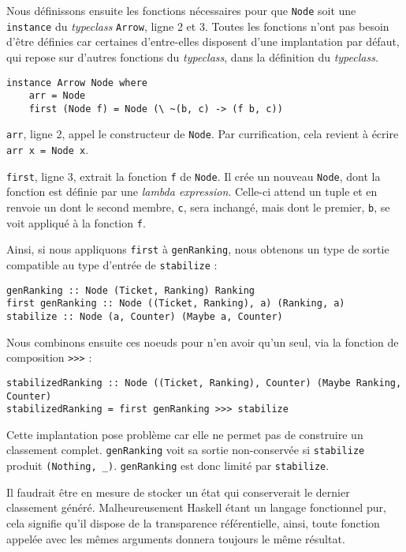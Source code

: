 \documentclass{llncs}
\newcommand{\Arrv}{\lstinline{Arrow}, }
\begin{document}
Nous définissons ensuite les fonctions nécessaires pour que \lstinline{Node} soit
une \lstinline{instance} du \emph{typeclass} \Arrv ligne 2 et 3.
Toutes les fonctions n'ont pas besoin d'être définies car certaines d'entre-elles
disposent d'une implantation par défaut, qui repose sur d'autres fonctions du
\emph{typeclass}, dans la définition du \emph{typeclass}.

\begin{lstlisting}
instance Arrow Node where
    arr = Node
    first (Node f) = Node (\ ~(b, c) -> (f b, c))
\end{lstlisting}

\lstinline{arr}, ligne 2, appel le constructeur de \lstinline{Node}.
Par currification, cela revient à écrire \lstinline{arr x = Node x}.

\lstinline{first}, ligne 3, extrait la fonction \lstinline{f} de \lstinline{Node}.
Il crée un nouveau \lstinline{Node}, dont la fonction est définie par
une \emph{lambda expression}.
Celle-ci attend un tuple et en renvoie un dont le second membre, \lstinline{c},
sera inchangé, mais dont le premier, \lstinline{b}, se voit appliqué à la fonction \lstinline{f}.

Ainsi, si nous appliquons \lstinline{first} à \lstinline{genRanking}, nous obtenons
un type de sortie compatible au type d'entrée de \lstinline{stabilize} :
\begin{lstlisting}
genRanking :: Node (Ticket, Ranking) Ranking
first genRanking :: Node ((Ticket, Ranking), a) (Ranking, a)
stabilize :: Node (a, Counter) (Maybe a, Counter)
\end{lstlisting}

Nous combinons ensuite ces noeuds pour n'en avoir qu'un seul, via la fonction
de composition \lstinline{>>>} :
\begin{lstlisting}
stabilizedRanking :: Node ((Ticket, Ranking), Counter) (Maybe Ranking, Counter)
stabilizedRanking = first genRanking >>> stabilize
\end{lstlisting}

Cette implantation pose problème car elle ne permet pas de construire un classement
complet. \lstinline{genRanking} voit sa sortie non-conservée si \lstinline{stabilize}
produit \lstinline{(Nothing, _)}.
\lstinline{genRanking} est donc limité par \lstinline{stabilize}.

Il faudrait être en mesure de stocker un état qui conserverait le dernier classement
généré.
Malheureusement Haskell étant un langage fonctionnel pur, cela signifie qu'il dispose
de la transparence référentielle, ainsi, toute fonction appelée avec les mêmes arguments
donnera toujours le même résultat.
\end{document}
